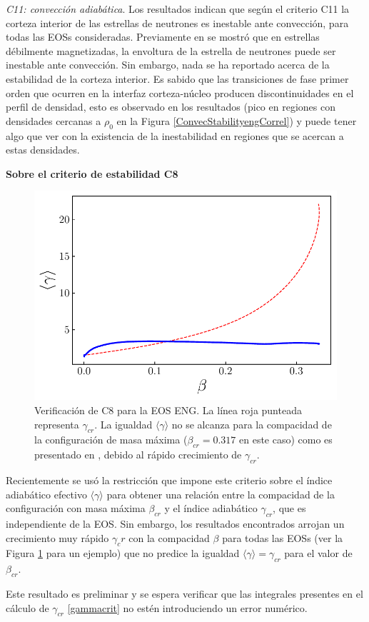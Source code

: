 \emph{C11: convección adiabática}. Los resultados indican que según el criterio C11 la corteza interior de las estrellas de neutrones es inestable ante convección, para todas las EOSs consideradas. Previamente en \cite{Miralles1997} se mostró que en estrellas débilmente magnetizadas, la envoltura de la estrella de neutrones puede ser inestable ante convección. Sin embargo, nada se ha reportado acerca de la estabilidad de la corteza interior. Es sabido \cite{Haensel2007} que las transiciones de fase primer orden que ocurren en la interfaz corteza-núcleo producen discontinuidades en el perfil de densidad, esto es observado en los resultados (pico en regiones con densidades cercanas a $\rho_0$ en la Figura \ref{ConvecStabilityengCorrel}) y puede tener algo que ver con la existencia de la inestabilidad en regiones que se acercan a estas densidades.

\vspace{0.3cm}
\noindent\textbf{Sobre el criterio de estabilidad C8}

\begin{figure}[H]
    \centering
    \includegraphics[width=0.6\linewidth]{figures/AdiabaticIndexENGbeta.pdf}
    \caption[Estabilidad usando el índice adiabático]{Verificación de C8 para la EOS ENG. La línea roja punteada representa $\gamma_{cr}$. La igualdad $\langle \gamma \rangle$ no se alcanza para la compacidad de la configuración de masa máxima ($\beta_{cr}=0.317$ en este caso) como es presentado en \cite{Koliogiannis2019a}, debido al rápido crecimiento de $\gamma_{cr}$.} 
    \label{AdiabaticIndexCriterio}
\end{figure}

\noindent Recientemente \cite{Koliogiannis2019a} se usó la restricción que impone este criterio sobre el índice adiabático efectivo $\langle \gamma \rangle$ para obtener una relación entre la compacidad de la configuración con masa máxima $\beta_{cr}$ y el índice adiabático $\gamma_{cr}$, que es independiente de la EOS. Sin embargo, los resultados encontrados arrojan un crecimiento muy rápido $\gamma_cr$ con la compacidad $\beta$ para todas las EOSs (ver la Figura \ref{AdiabaticIndexCriterio} para un ejemplo) que no predice la igualdad $\langle \gamma \rangle = \gamma_{cr}$ para el valor de $\beta_{cr}$.

Este resultado es preliminar y se espera verificar que las integrales presentes en el cálculo de $\gamma_{cr}$ \eqref{gammacrit} no estén introduciendo un error numérico.